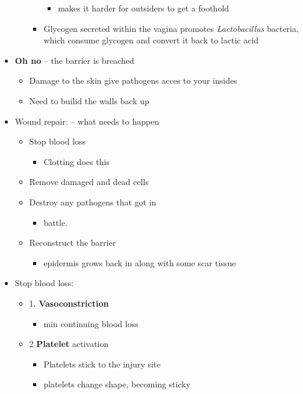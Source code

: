 \documentclass{article}
\theoremstyle{definition}
\begin{document}
\begin{itemize}
\begin{itemize}
\begin{itemize}
\begin{itemize}
							\item makes it harder for outsiders to get a foothold
						\end{itemize}
					\item Glycogen secreted within the vagina promotes \textit{Lactobacillus}  bacteria, which consume glycogen and convert it back to lactic acid
				\end{itemize}
		\end{itemize}
	\item \textbf{Oh no}  -- the barrier is breached
		\begin{itemize}
			\item Damage to the skin give pathogens acces to your insides
			\item Need to builid the walls back up
		\end{itemize}
	\item Wound repair: -- what needs to happen
		\begin{itemize}
			\item Stop blood loss
				\begin{itemize}
					\item Clotting does this
				\end{itemize}
			\item Remove damaged and dead cells 
			\item Destroy any pathogens that got in
				\begin{itemize}
					\item battle.
				\end{itemize}
			\item Reconstruct the barrier
				\begin{itemize}
					\item epidermis grows back in along with some scar tissue
				\end{itemize}
		\end{itemize}
	\item Stop blood loss:
		\begin{itemize}
			\item 1. \textbf{Vasoconstriction} 
				\begin{itemize}
					\item min continuing blood loss
				\end{itemize}
			\item 2 \textbf{Platelet}  activation
				\begin{itemize}
					\item Platelets stick to the injury site
					\item platelets change shape, becoming sticky

\end{itemize}
\end{itemize}
\end{itemize}
\end{document}
